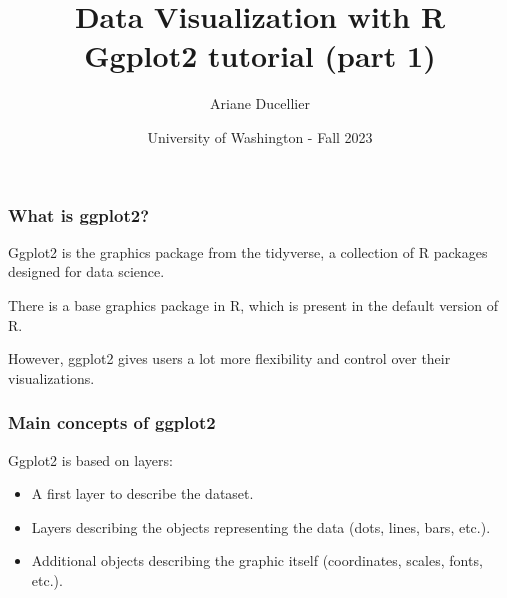 \documentclass{beamer}
\title[Data Visualization with R - Ggplot2 tutorial (part 1)]{Data Visualization with R \\ Ggplot2 tutorial (part 1)}
\author{Ariane Ducellier}
\date{University of Washington - Fall 2023}
\begin{document}
	\begin{frame}
		\titlepage
	\end{frame}

	\begin{frame}
		\frametitle{What is ggplot2?}

		Ggplot2 is the graphics package from the tidyverse, a collection of R packages designed for data science. 

		\vspace{2em}

		There is a base graphics package in R, which is present in the default version of R.

		\vspace{2em}

		However, ggplot2 gives users a lot more flexibility and control over their visualizations.
		
	\end{frame}

	\begin{frame}
		\frametitle{Main concepts of ggplot2}

		Ggplot2 is based on layers:

		\vspace{2em}
		
		\begin{itemize}
		\setlength{\itemsep}{1em}
			\item A first layer to describe the dataset.
			\item Layers describing the objects representing the data (dots, lines, bars, etc.).
			\item Additional objects describing the graphic itself (coordinates, scales, fonts, etc.).
		\end{itemize}

	\end{frame}
\end{document}
